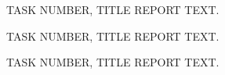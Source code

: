 \documentclass[10pt,a4paper]{article}
\begin{document}
\frontpage

\begin{task}{TASK NUMBER, TITLE}
REPORT TEXT.
\end{task}

\begin{task}{TASK NUMBER, TITLE}
REPORT TEXT.
\end{task}

\begin{task}{TASK NUMBER, TITLE}
REPORT TEXT.
\end{task}



\end{document}
